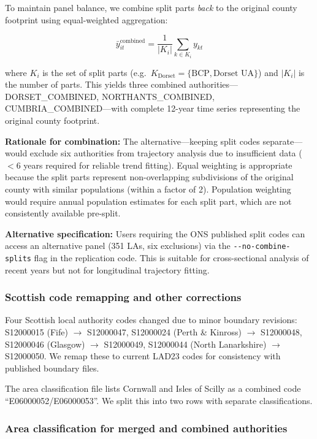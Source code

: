 \documentclass[12pt,a4paper]{article}
\begin{document}
To maintain panel balance, we combine split parts \textit{back} to the original county footprint using equal-weighted aggregation:

\[
\bar{y}_{it}^{\text{combined}} = \frac{1}{|K_i|} \sum_{k \in K_i} y_{kt}
\]

where $K_i$ is the set of split parts (e.g.\ $K_{\text{Dorset}} = \{\text{BCP}, \text{Dorset UA}\}$) and $|K_i|$ is the number of parts. This yields three combined authorities---DORSET\_COMBINED, NORTHANTS\_COMBINED, CUMBRIA\_COMBINED---with complete 12-year time series representing the original county footprint.

\textbf{Rationale for combination:} The alternative---keeping split codes separate---would exclude six authorities from trajectory analysis due to insufficient data ($<6$ years required for reliable trend fitting). Equal weighting is appropriate because the split parts represent non-overlapping subdivisions of the original county with similar populations (within a factor of 2). Population weighting would require annual population estimates for each split part, which are not consistently available pre-split.

\textbf{Alternative specification:} Users requiring the ONS published split codes can access an alternative panel (351 LAs, six exclusions) via the \texttt{-{}-no-combine-splits} flag in the replication code. This is suitable for cross-sectional analysis of recent years but not for longitudinal trajectory fitting.

\subsubsection{Scottish code remapping and other corrections}

Four Scottish local authority codes changed due to minor boundary revisions: S12000015 (Fife) $\to$ S12000047, S12000024 (Perth \& Kinross) $\to$ S12000048, S12000046 (Glasgow) $\to$ S12000049, S12000044 (North Lanarkshire) $\to$ S12000050. We remap these to current LAD23 codes for consistency with published boundary files.

The area classification file lists Cornwall and Isles of Scilly as a combined code ``E06000052/E06000053''. We split this into two rows with separate classifications.

\subsubsection{Area classification for merged and combined authorities}
\end{document}
